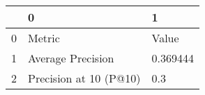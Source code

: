 \begin{tabular}{lll}
\toprule
{} &                       0 &         1 \\
\midrule
0 &                  Metric &     Value \\
1 &       Average Precision &  0.369444 \\
2 &  Precision at 10 (P@10) &       0.3 \\
\bottomrule
\end{tabular}
